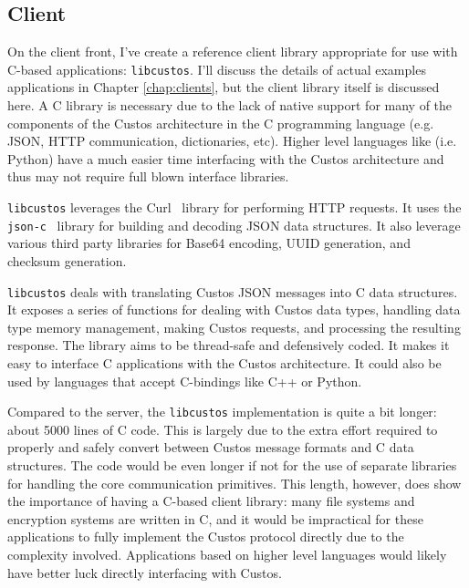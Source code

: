 \subsection{Client}

On the client front, I've create a reference client library
appropriate for use with C-based applications:
\texttt{libcustos}. I'll discuss the details of actual examples
applications in Chapter \ref{chap:clients}, but the client library
itself is discussed here. A C library is necessary due to the lack of
native support for many of the components of the Custos architecture
in the C programming language (e.g. JSON, HTTP communication,
dictionaries, etc). Higher level languages like (i.e. Python) have a
much easier time interfacing with the Custos architecture and thus may
not require full blown interface libraries.

\texttt{libcustos} leverages the Curl~\cite{curl} library for
performing HTTP requests. It uses the \texttt{json-c}~\cite{json-c}
library for building and decoding JSON data structures. It also
leverage various third party libraries for Base64 encoding, UUID
generation, and checksum generation.

\texttt{libcustos} deals with translating Custos JSON messages into C
data structures. It exposes a series of functions for dealing with
Custos data types, handling data type memory management, making Custos
requests, and processing the resulting response. The library aims to
be thread-safe and defensively coded. It makes it easy to interface C
applications with the Custos architecture. It could also be used by
languages that accept C-bindings like C++ or Python.

Compared to the server, the \texttt{libcustos} implementation is quite
a bit longer: about 5000 lines of C code. This is largely due to the
extra effort required to properly and safely convert between Custos
message formats and C data structures. The code would be even longer
if not for the use of separate libraries for handling the core
communication primitives. This length, however, does show the
importance of having a C-based client library: many file systems and
encryption systems are written in C, and it would be impractical for
these applications to fully implement the Custos protocol directly due
to the complexity involved. Applications based on higher level
languages would likely have better luck directly interfacing with
Custos.

